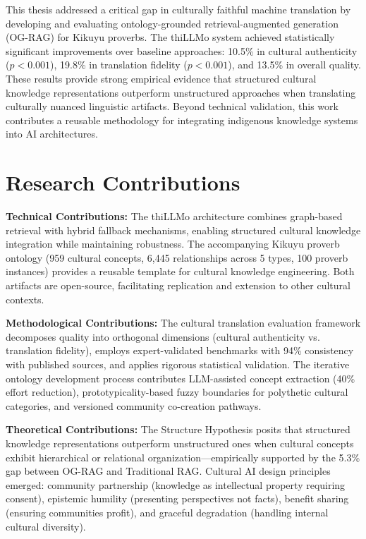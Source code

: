 \label{chap:conclusion}

This thesis addressed a critical gap in culturally faithful machine translation by developing and evaluating ontology-grounded retrieval-augmented generation (OG-RAG) for Kikuyu proverbs. The thiLLMo system achieved statistically significant improvements over baseline approaches: 10.5\% in cultural authenticity ($p<0.001$), 19.8\% in translation fidelity ($p<0.001$), and 13.5\% in overall quality. These results provide strong empirical evidence that structured cultural knowledge representations outperform unstructured approaches when translating culturally nuanced linguistic artifacts. Beyond technical validation, this work contributes a reusable methodology for integrating indigenous knowledge systems into AI architectures.

\section{Research Contributions}
\label{sec:contributions}

\textbf{Technical Contributions:} The thiLLMo architecture combines graph-based retrieval with hybrid fallback mechanisms, enabling structured cultural knowledge integration while maintaining robustness. The accompanying Kikuyu proverb ontology (959 cultural concepts, 6,445 relationships across 5 types, 100 proverb instances) provides a reusable template for cultural knowledge engineering. Both artifacts are open-source, facilitating replication and extension to other cultural contexts.

\textbf{Methodological Contributions:} The cultural translation evaluation framework decomposes quality into orthogonal dimensions (cultural authenticity vs. translation fidelity), employs expert-validated benchmarks with 94\% consistency with published sources, and applies rigorous statistical validation. The iterative ontology development process contributes LLM-assisted concept extraction (40\% effort reduction), prototypicality-based fuzzy boundaries for polythetic cultural categories, and versioned community co-creation pathways.

\textbf{Theoretical Contributions:} The Structure Hypothesis posits that structured knowledge representations outperform unstructured ones when cultural concepts exhibit hierarchical or relational organization—empirically supported by the 5.3\% gap between OG-RAG and Traditional RAG. Cultural AI design principles emerged: community partnership (knowledge as intellectual property requiring consent), epistemic humility (presenting perspectives not facts), benefit sharing (ensuring communities profit), and graceful degradation (handling internal cultural diversity).

